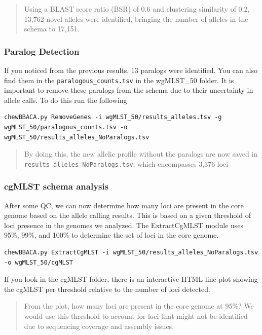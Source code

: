 \documentclass[
]{book}
\begin{document}
\begin{quote}
Using a BLAST score ratio (BSR) of 0.6 and clustering similarity of 0.2, 13,762 novel alleles were identified, bringing the number of alleles in the schema to 17,151.
\end{quote}

\subsubsection{Paralog Detection}\label{paralog-detection}

If you noticed from the previous results, 13 paralogs were identified. You can also find them in the \texttt{paralogous\_counts.tsv} in the wgMLST\_50 folder. It is important to remove these paralogs from the schema due to their uncertainty in allele calls. To do this run the following

\begin{verbatim}
chewBBACA.py RemoveGenes -i wgMLST_50/results_alleles.tsv -g wgMLST_50/paralogous_counts.tsv -o wgMLST_50/results_alleles_NoParalogs.tsv
\end{verbatim}

\begin{quote}
By doing this, the new allelic profile without the paralogs are now saved in \texttt{results\_alleles\_NoParalogs.tsv}, which encompasses 3,376 loci
\end{quote}

\subsubsection{cgMLST schema analysis}\label{cgmlst-schema-analysis}

After some QC, we can now determine how many loci are present in the core genome based on the allele calling results. This is based on a given threshold of loci presence in the genomes we analyzed. The ExtractCgMLST module uses 95\%, 99\%, and 100\% to determine the set of loci in the core genome.

\begin{verbatim}
chewBBACA.py ExtractCgMLST -i wgMLST_50/results_alleles_NoParalogs.tsv -o wgMLST_50/cgMLST
\end{verbatim}

If you look in the cgMLST folder, there is an interactive HTML line plot showing the cgMLST per threshold relative to the number of loci detected.

\begin{quote}
From the plot, how many loci are present in the core genome at 95\%? We would use this threshold to account for loci that might not be identified due to sequencing coverage and assembly issues.
\end{quote}
\end{document}

